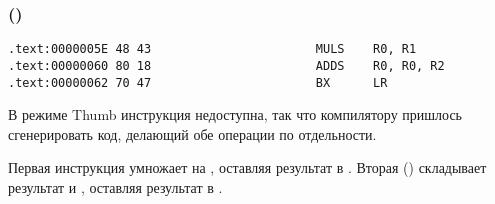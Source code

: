\subsubsection{\OptimizingKeilVI (\ThumbMode)}

\begin{lstlisting}[label=ARM_leaf_example2]
.text:0000005E 48 43                       MULS    R0, R1
.text:00000060 80 18                       ADDS    R0, R0, R2
.text:00000062 70 47                       BX      LR
\end{lstlisting}

В режиме Thumb инструкция  недоступна, так что компилятору пришлось сгенерировать код, 
делающий обе операции по отдельности.

Первая инструкция  умножает  на , оставляя результат в .
Вторая () складывает результат и , оставляя результат в .

